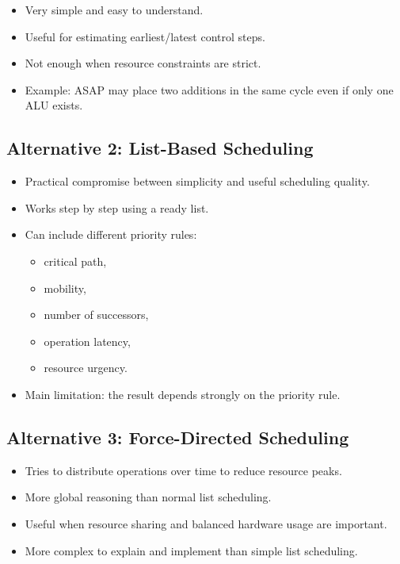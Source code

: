 \documentclass[11pt,a4paper]{article}
\begin{document}
\begin{itemize}[leftmargin=*]
    \item Very simple and easy to understand.
    \item Useful for estimating earliest/latest control steps.
    \item Not enough when resource constraints are strict.
    \item Example: ASAP may place two additions in the same cycle even if only one ALU exists.
\end{itemize}

\subsection*{Alternative 2: List-Based Scheduling}

\begin{itemize}[leftmargin=*]
    \item Practical compromise between simplicity and useful scheduling quality.
    \item Works step by step using a ready list.
    \item Can include different priority rules:
    \begin{itemize}
        \item critical path,
        \item mobility,
        \item number of successors,
        \item operation latency,
        \item resource urgency.
    \end{itemize}
    \item Main limitation: the result depends strongly on the priority rule.
\end{itemize}

\subsection*{Alternative 3: Force-Directed Scheduling}

\begin{itemize}[leftmargin=*]
    \item Tries to distribute operations over time to reduce resource peaks.
    \item More global reasoning than normal list scheduling.
    \item Useful when resource sharing and balanced hardware usage are important.
    \item More complex to explain and implement than simple list scheduling.
\end{itemize}
\end{document}
